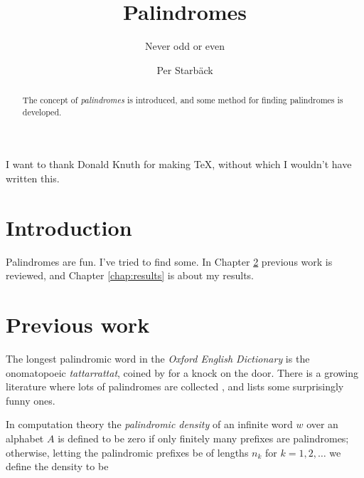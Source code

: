 \documentclass[thesis]{cluu}
\begin{document}
\author{Per Starbäck}
\title{Palindromes}
\subtitle{Never odd or even}

\maketitle

\begin{abstract}
  The concept of \emph{palindromes} is introduced, and some method for
  finding palindromes is developed.
\end{abstract}

\tableofcontents


I want to thank Donald Knuth for making \TeX, without which
I wouldn't have written this.


\chapter{Introduction}

Palindromes are fun. I've tried to find some.
In Chapter \ref{chap:prev} previous work is reviewed, and
Chapter \ref{chap:results} is about my results.

\chapter{Previous work}
\label{chap:prev}

The longest palindromic word in the \emph{Oxford English Dictionary}
is the onomatopoeic \emph{tattarrattat}, coined by
\textcite{joyce:ulysses} for a knock on the door.
There is a growing literature where lots of palindromes are collected
\parencite{chism92:a_to_z, bergerson73},
and \textcite{funny} lists some surprisingly funny ones.

In computation theory the \emph{palindromic density} of an infinite
word \( w \) over an alphabet \( A \) is defined to be zero if only
finitely many prefixes are palindromes; otherwise, letting the
palindromic prefixes be of lengths \( n_k \) for \( k=1, 2, \dots\) we
define the density to be 
\end{document}
